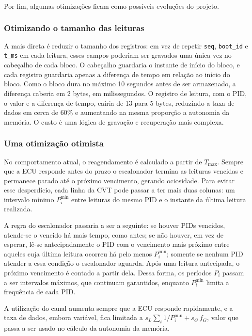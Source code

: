 \documentclass[12pt]{article}
\begin{document}
Por fim, algumas otimizações ficam como possíveis evoluções do projeto.

\subsubsection{Otimizando o tamanho das leituras}

 A mais direta é reduzir o tamanho dos registros: em vez de repetir \texttt{seq}, \texttt{boot\_id} e \texttt{t\_ms} em cada leitura, esses campos poderiam ser gravados uma única vez no cabeçalho de cada bloco. O cabeçalho guardaria o instante de início do bloco, e cada registro guardaria apenas a diferença de tempo em relação ao início do bloco. Como o bloco dura no máximo 10 segundos antes de ser armazenado, a diferença caberia em 2 bytes, em milissegundos. O registro de leitura, com o PID, o valor e a diferença de tempo, cairia de 13 para 5 bytes, reduzindo a taxa de dados em cerca de 60\% e aumentando na mesma proporção a autonomia da memória. O custo é uma lógica de gravação e recuperação mais complexa.

\subsubsection{Uma otimização otimista}
No comportamento atual, o reagendamento é calculado a partir de $T_{\max}$. Sempre que a ECU responde antes do prazo o escalonador termina as leituras vencidas e permanece parado até o próximo vencimento, gerando ociosidade. Para evitar esse desperdício, cada linha da CVT pode passar a ter mais duas colunas: um intervalo mínimo $P_i^{\min}$ entre leituras do mesmo PID e o instante da última leitura realizada.

A regra do escalonador passaria a ser a seguinte: se houver PIDs vencidos, atende-se o vencido há mais tempo, como antes; se não houver, em vez de esperar, lê-se antecipadamente o PID com o vencimento mais próximo entre aqueles cuja última leitura ocorreu há pelo menos $P_i^{\min}$; somente se nenhum PID atender a essa condição o escalonador aguarda. Após uma leitura antecipada, o próximo vencimento é contado a partir dela. Dessa forma, os períodos $P_i$ passam a ser intervalos máximos, que continuam garantidos, enquanto $P_i^{\min}$ limita a frequência de cada PID. 

A utilização do canal aumenta sempre que a ECU responde rapidamente, e a taxa de dados, embora variável, fica limitada a $s_L \sum_i 1/P_i^{\min} + s_G\,f_G$, valor que passa a ser usado no cálculo da autonomia da memória.
\end{document}
